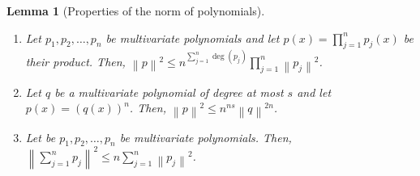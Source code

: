 \documentclass[12pt]{article}
\newtheorem{lemma}[definition]{Lemma}
\newcommand{\norm}[1]{\left\| #1 \right\|}  %
\begin{document}
\begin{lemma}[Properties of the norm of polynomials]
\label{lemma:properties-of-norm-of-polynomials}
\hspace{1cm} %
\begin{enumerate}
\item Let $p_1, p_2, \dots, p_n$ be multivariate polynomials and let $p(x) =
\prod_{j=1}^n p_j(x)$ be their product.  Then, $\norm{p}^2 \le n^{\sum_{j=1}^n
\deg(p_j)} \prod_{j=1}^n \norm{p_j}^2$.

\item Let $q$ be a multivariate polynomial of degree at most $s$ and let $p(x) =
(q(x))^n$. Then, $\norm{p}^2 \le n^{ns} \norm{q}^{2n}$.

\item Let be $p_1, p_2, \dots, p_n$ be multivariate polynomials. Then,
$\norm{\sum_{j=1}^n p_j}^2 \le n \sum_{j=1}^n \norm{p_j}^2$.
\end{enumerate}
\end{lemma}
\end{document}
